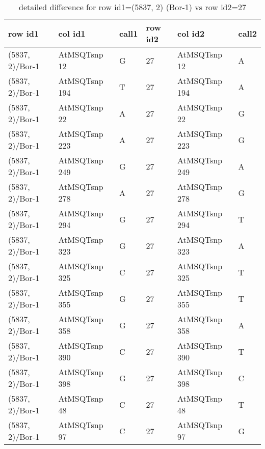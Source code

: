 \begin{center}
\begin{longtable}{|l|l|l|l|l|l|}
\caption{detailed difference for row id1=(5837, 2) (Bor-1) vs row id2=27} \label{table_dm5}\\
\hline
row id1&col id1&call1&row id2&col id2&call2\\
\hline
(5837, 2)/Bor-1&AtMSQTsnp 12&G&27&AtMSQTsnp 12&A\\
(5837, 2)/Bor-1&AtMSQTsnp 194&T&27&AtMSQTsnp 194&A\\
(5837, 2)/Bor-1&AtMSQTsnp 22&A&27&AtMSQTsnp 22&G\\
(5837, 2)/Bor-1&AtMSQTsnp 223&A&27&AtMSQTsnp 223&G\\
(5837, 2)/Bor-1&AtMSQTsnp 249&G&27&AtMSQTsnp 249&A\\
(5837, 2)/Bor-1&AtMSQTsnp 278&A&27&AtMSQTsnp 278&G\\
(5837, 2)/Bor-1&AtMSQTsnp 294&G&27&AtMSQTsnp 294&T\\
(5837, 2)/Bor-1&AtMSQTsnp 323&G&27&AtMSQTsnp 323&A\\
(5837, 2)/Bor-1&AtMSQTsnp 325&C&27&AtMSQTsnp 325&T\\
(5837, 2)/Bor-1&AtMSQTsnp 355&G&27&AtMSQTsnp 355&T\\
(5837, 2)/Bor-1&AtMSQTsnp 358&G&27&AtMSQTsnp 358&A\\
(5837, 2)/Bor-1&AtMSQTsnp 390&C&27&AtMSQTsnp 390&T\\
(5837, 2)/Bor-1&AtMSQTsnp 398&G&27&AtMSQTsnp 398&C\\
(5837, 2)/Bor-1&AtMSQTsnp 48&C&27&AtMSQTsnp 48&T\\
(5837, 2)/Bor-1&AtMSQTsnp 97&C&27&AtMSQTsnp 97&G\\
\hline
\end{longtable}
\end{center}

